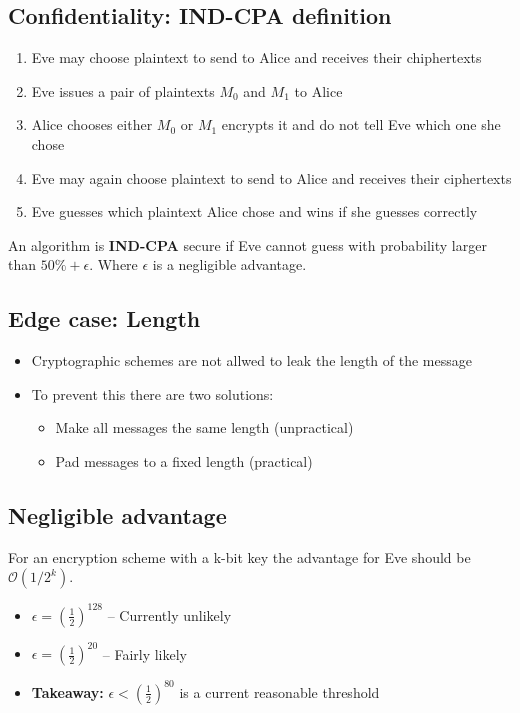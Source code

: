 \documentclass[12pt,a4paper]{article}
\begin{document}
\subsection{Confidentiality: IND-CPA definition}
\begin{enumerate}
    \item Eve may choose plaintext to send to Alice and receives their chiphertexts
    \item Eve issues a pair of plaintexts $M_0$ and $M_1$ to Alice
    \item Alice chooses either $M_0$ or $M_1$ encrypts it and do not tell Eve which one she chose
    \item Eve may again choose plaintext to send to Alice and receives their ciphertexts
    \item Eve guesses which plaintext Alice chose and wins if she guesses correctly
\end{enumerate}
An algorithm is \textbf{IND-CPA} secure if Eve cannot guess with probability larger than $50\% + \epsilon$. Where $\epsilon$ is a negligible advantage.

\subsection{Edge case: Length}
\begin{itemize}
    \item Cryptographic schemes are not allwed to leak the length of the message
    \item To prevent this there are two solutions:
    \begin{itemize}
        \item Make all messages the same length (unpractical)
        \item Pad messages to a fixed length (practical)
    \end{itemize}
\end{itemize}

\subsection{Negligible advantage}
For an encryption scheme with a k-bit key the advantage for Eve should be $\mathcal{O}(1/2^k)$.
\begin{itemize}
    \item $\epsilon = (\frac{1}{2})^{128}$ -- Currently unlikely
    \item $\epsilon = (\frac{1}{2})^{20}$ -- Fairly likely
    \item \textbf{Takeaway:} $\epsilon < (\frac{1}{2})^{80}$ is a current reasonable threshold
\end{itemize}
\end{document}
